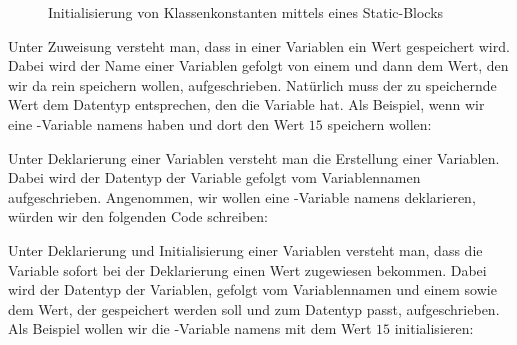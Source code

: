 \documentclass{tuda-pub}
\begin{document}
  \begin{figure}[h]
    \centering
    
    \caption{Initialisierung von Klassenkonstanten mittels eines Static-Blocks}
  \end{figure}

  \begin{note}[title=Information:]
    Unter Zuweisung versteht man, dass in einer Variablen ein Wert gespeichert wird. Dabei wird
    der Name einer Variablen gefolgt von einem \inlinejava{=} und dann dem Wert, den wir da rein
    speichern wollen, aufgeschrieben. Natürlich muss der zu speichernde Wert dem Datentyp
    entsprechen, den die Variable hat. Als Beispiel, wenn wir eine -Variable
    namens  haben und dort den Wert \(15\) speichern wollen:

    \br

    \begin{center}
    \end{center}

    \br

    Unter Deklarierung einer Variablen versteht man die Erstellung einer Variablen. Dabei wird
    der Datentyp der Variable gefolgt vom Variablennamen aufgeschrieben. Angenommen, wir wollen
    eine -Variable namens  deklarieren, würden wir den folgenden
    Code schreiben:

    \br

    \begin{center}
    \end{center}

    \br

    Unter Deklarierung und Initialisierung einer Variablen versteht man, dass die Variable sofort
    bei der Deklarierung einen Wert zugewiesen bekommen. Dabei wird der Datentyp der Variablen,
    gefolgt vom Variablennamen und einem \inlinejava{=} sowie dem Wert, der gespeichert werden
    soll und zum Datentyp passt, aufgeschrieben. Als Beispiel wollen wir die
    -Variable namens  mit dem Wert \(15\) initialisieren:

    \br

    \begin{center}
    \end{center}
  \end{note}
\end{document}
